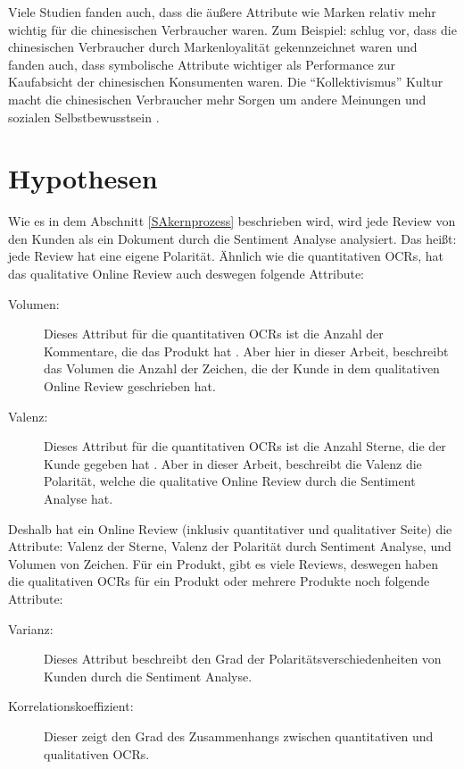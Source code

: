 Viele Studien fanden auch, dass die äußere Attribute wie Marken relativ mehr wichtig für die chinesischen Verbraucher waren. Zum Beispiel: \citet{chun1998differences} schlug vor, dass die chinesischen Verbraucher durch Markenloyalität gekennzeichnet waren und \citet{zhou2003symbolic} fanden auch, dass symbolische Attribute wichtiger als Performance zur Kaufabsicht der chinesischen Konsumenten waren. Die ``Kollektivismus'' Kultur macht die chinesischen Verbraucher mehr Sorgen um andere Meinungen und sozialen Selbstbewusstsein \citep{rahman2010evaluative}.

\section{Hypothesen} \label{sec:hypothese}
Wie es in dem Abschnitt \ref{SAkernprozess} beschrieben wird, wird jede Review von den Kunden als ein Dokument durch die Sentiment Analyse analysiert. Das heißt: jede Review hat eine eigene Polarität. Ähnlich wie die quantitativen \ac{OCRs}, hat das qualitative Online Review auch deswegen folgende Attribute:
\begin{description}
	\item[Volumen:] Dieses Attribut für die quantitativen \ac{OCRs} ist die Anzahl der Kommentare, die das Produkt hat \citep{Shrihari2012}. Aber hier in dieser Arbeit, beschreibt das Volumen die Anzahl der Zeichen, die der Kunde in dem qualitativen Online Review geschrieben hat.
	\item[Valenz:] Dieses Attribut für die quantitativen \ac{OCRs} ist die Anzahl Sterne, die der Kunde gegeben hat \citep{Shrihari2012}. Aber in dieser Arbeit, beschreibt die Valenz die Polarität, welche die qualitative Online Review durch die Sentiment Analyse hat.
\end{description}

Deshalb hat ein Online Review (inklusiv quantitativer und qualitativer Seite) die Attribute: Valenz der Sterne, Valenz der Polarität durch Sentiment Analyse, und Volumen von Zeichen. Für ein Produkt, gibt es viele Reviews, deswegen haben die qualitativen \ac{OCRs} für ein Produkt oder mehrere Produkte noch folgende Attribute:
\begin{description}
	\item[Varianz:] Dieses Attribut beschreibt den Grad der Polaritätsverschiedenheiten von Kunden durch die Sentiment Analyse.
	\item[Korrelationskoeffizient:] Dieser zeigt den Grad des Zusammenhangs zwischen quantitativen und qualitativen \ac{OCRs}.
\end{description}

